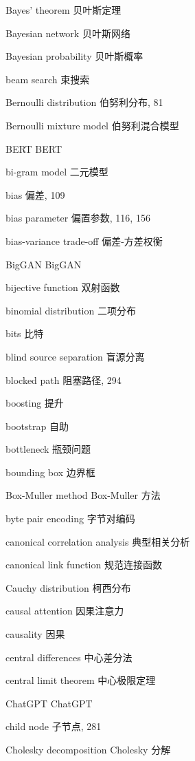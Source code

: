 Bayes’ theorem 贝叶斯定理\par
Bayesian network 贝叶斯网络\par
Bayesian probability 贝叶斯概率\par
beam search 束搜索\par
Bernoulli distribution 伯努利分布, 81\par
Bernoulli mixture model 伯努利混合模型\par
BERT BERT\par
bi-gram model 二元模型\par
bias 偏差, 109\par
bias parameter 偏置参数, 116, 156\par
bias-variance trade-off 偏差-方差权衡\par
BigGAN BigGAN\par
bijective function 双射函数\par
binomial distribution 二项分布\par
bits 比特\par
blind source separation 盲源分离\par
blocked path 阻塞路径, 294\par
boosting 提升\par
bootstrap 自助\par
bottleneck 瓶颈问题\par
bounding box 边界框\par
Box-Muller method Box-Muller 方法\par
byte pair encoding 字节对编码\par
canonical correlation analysis 典型相关分析\par
canonical link function 规范连接函数\par
Cauchy distribution 柯西分布\par
causal attention 因果注意力\par
causality 因果\par
central differences 中心差分法\par
central limit theorem 中心极限定理\par
ChatGPT ChatGPT\par
child node 子节点, 281\par
Cholesky decomposition Cholesky 分解\par
